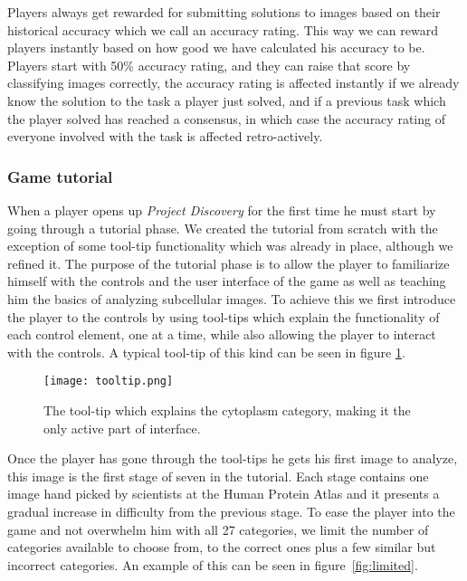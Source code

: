 Players always get rewarded for submitting solutions to images based on their historical accuracy which we call an accuracy rating. This way we can reward players instantly based on how good we have calculated his accuracy to be. Players start with 50\% accuracy rating, and they can raise that score by classifying images correctly, the accuracy rating is affected instantly if we already know the solution to the task a player just solved, and if a previous task which the player solved has reached a consensus, in which case the accuracy rating of everyone involved with the task is affected retro-actively.

\subsubsection{Game tutorial}
When a player opens up \emph{Project Discovery} for the first time he must start by going through a tutorial phase. We created the tutorial from scratch with the exception of some tool-tip functionality which was already in place, although we refined it. The purpose of the tutorial phase is to allow the player to familiarize himself with the controls and the user interface of the game as well as teaching him the basics of analyzing subcellular images. To achieve this we first introduce the player to the controls by using tool-tips which explain the functionality of each control element, one at a time, while also allowing the player to interact with the controls. A typical tool-tip of this kind can be seen in figure \ref{fig:tooltip}.

\begin{figure}[H]
\centering
\graphicspath{ {./graphics/} }
\centerline{\texttt{[image: tooltip.png]}}
\caption{\label{fig:tooltip}The tool-tip which explains the cytoplasm category, making it the only active part of interface.}
\end{figure}

Once the player has gone through the tool-tips he gets his first image to analyze, this image is the first stage of seven in the tutorial. Each stage contains one image hand picked by scientists at the Human Protein Atlas and it presents a gradual increase in difficulty from the previous stage. To ease the player into the game and not overwhelm him with all 27 categories, we limit the number of categories available to choose from, to the correct ones plus a few similar but incorrect categories. An example of this can be seen in figure~\ref{fig:limited}.

